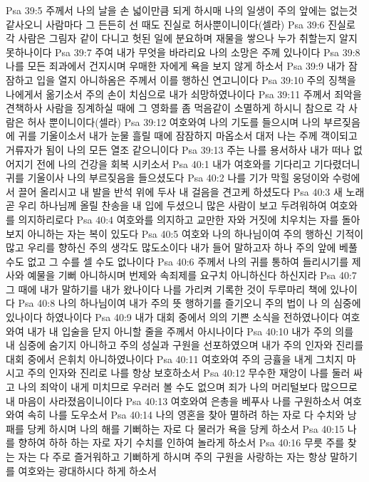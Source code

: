 Psa 39:5  주께서 나의 날을 손 넓이만큼 되게 하시매 나의 일생이 주의 앞에는 없는것 같사오니 사람마다 그 든든히 선 때도 진실로 허사뿐이니이다(셀라)
Psa 39:6  진실로 각 사람은 그림자 같이 다니고 헛된 일에 분요하며 재물을 쌓으나 누가 취할는지 알지 못하나이다
Psa 39:7  주여 내가 무엇을 바라리요 나의 소망은 주께 있나이다
Psa 39:8  나를 모든 죄과에서 건지시며 우매한 자에게 욕을 보지 않게 하소서
Psa 39:9  내가 잠잠하고 입을 열지 아니하옴은 주께서 이를 행하신 연고니이다
Psa 39:10  주의 징책을 나에게서 옮기소서 주의 손이 치심으로 내가 쇠망하였나이다
Psa 39:11  주께서 죄악을 견책하사 사람을 징계하실 때에 그 영화를 좀 먹음같이 소멸하게 하시니 참으로 각 사람은 허사 뿐이니이다(셀라)
Psa 39:12  여호와여 나의 기도를 들으시며 나의 부르짖음에 귀를 기울이소서 내가 눈물 흘릴 때에 잠잠하지 마옵소서 대저 나는 주께 객이되고 거류자가 됨이 나의 모든 열조 같으니이다
Psa 39:13  주는 나를 용서하사 내가 떠나 없어지기 전에 나의 건강을 회복 시키소서
Psa 40:1  내가 여호와를 기다리고 기다렸더니 귀를 기울이사 나의 부르짖음을 들으셨도다
Psa 40:2  나를 기가 막힐 웅덩이와 수렁에서 끌어 올리시고 내 발을 반석 위에 두사 내 걸음을 견고케 하셨도다
Psa 40:3  새 노래 곧 우리 하나님께 올릴 찬송을 내 입에 두셨으니 많은 사람이 보고 두려워하여 여호와를 의지하리로다
Psa 40:4  여호와를 의지하고 교만한 자와 거짓에 치우치는 자를 돌아보지 아니하는 자는 복이 있도다
Psa 40:5  여호와 나의 하나님이여 주의 행하신 기적이 많고 우리를 향하신 주의 생각도 많도소이다 내가 들어 말하고자 하나 주의 앞에 베풀 수도 없고 그 수를 셀 수도 없나이다
Psa 40:6  주께서 나의 귀를 통하여 들리시기를 제사와 예물을 기뻐 아니하시며 번제와 속죄제를 요구치 아니하신다 하신지라
Psa 40:7  그 때에 내가 말하기를 내가 왔나이다 나를 가리켜 기록한 것이 두루마리 책에 있나이다
Psa 40:8  나의 하나님이여 내가 주의 뜻 행하기를 즐기오니 주의 법이 나 의 심중에 있나이다 하였나이다
Psa 40:9  내가 대회 중에서 의의 기쁜 소식을 전하였나이다 여호와여 내가 내 입술을 닫지 아니할 줄을 주께서 아시나이다
Psa 40:10  내가 주의 의를 내 심중에 숨기지 아니하고 주의 성실과 구원을 선포하였으며 내가 주의 인자와 진리를 대회 중에서 은휘치 아니하였나이다
Psa 40:11  여호와여 주의 긍휼을 내게 그치지 마시고 주의 인자와 진리로 나를 항상 보호하소서
Psa 40:12  무수한 재앙이 나를 둘러 싸고 나의 죄악이 내게 미치므로 우러러 볼 수도 없으며 죄가 나의 머리털보다 많으므로 내 마음이 사라졌음이니이다
Psa 40:13  여호와여 은총을 베푸사 나를 구원하소서 여호와여 속히 나를 도우소서
Psa 40:14  나의 영혼을 찾아 멸하려 하는 자로 다 수치와 낭패를 당케 하시며 나의 해를 기뻐하는 자로 다 물러가 욕을 당케 하소서
Psa 40:15  나를 향하여 하하 하는 자로 자기 수치를 인하여 놀라게 하소서
Psa 40:16  무릇 주를 찾는 자는 다 주로 즐거워하고 기뻐하게 하시며 주의 구원을 사랑하는 자는 항상 말하기를 여호와는 광대하시다 하게 하소서
